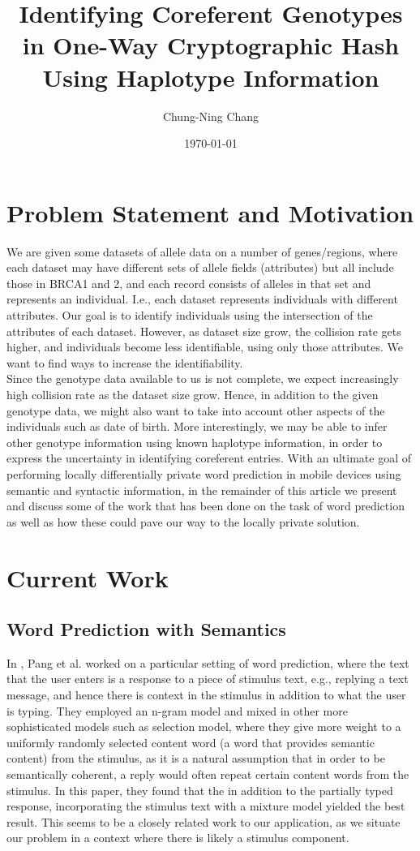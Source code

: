 \documentclass[14pt, oneside]{article}   	%
\title{Identifying Coreferent Genotypes in One-Way Cryptographic Hash Using Haplotype Information}
\author{Chung-Ning Chang}
\date{\today}							%
\begin{document}
\maketitle
\section{Problem Statement and Motivation}
We are given some datasets of allele data on a number of genes/regions, where each dataset may have different sets of allele fields (attributes) but all include those in BRCA1 and 2, and each record consists of alleles in that set and represents an individual. I.e., each dataset represents individuals with different attributes. Our goal is to identify individuals using the intersection of the attributes of each dataset. However, as dataset size grow, the collision rate gets higher, and individuals become less identifiable, using only those attributes. We want to find ways to increase the identifiability.
\\

Since the genotype data available to us is not complete, we expect increasingly high collision rate as the dataset size grow.
Hence, in addition to the given genotype data, we might also want to take into account other aspects of the individuals such as date of birth.
More interestingly, we may be able to infer other genotype information using known haplotype information,
in order to express the uncertainty in identifying coreferent entries.
With an ultimate goal of performing locally differentially private word prediction
in mobile devices using semantic and syntactic information,
in the remainder of this article we present and discuss some of the work
that has been done on the task of word prediction
as well as how these could pave our way to the locally private solution.\\
%
%
%
%
%
%
%
%
%
\section{Current Work}
\subsection{Word Prediction with Semantics}
In \cite{pang2012revisiting},
Pang et al. worked on a particular setting of word prediction,
where the text that the user enters is a response to a piece of stimulus text, e.g., replying a text message,
and hence there is context in the stimulus in addition to what the user is typing.
They employed an n-gram model and mixed in other more sophisticated models such as
selection model, where they give more weight to a uniformly randomly selected content word
(a word that provides semantic content)
from the stimulus, as it is a natural assumption that in order to be semantically coherent,
a reply would often repeat certain content words from the stimulus.
In this paper, they found that the in addition to the partially typed response,
incorporating the stimulus text with a mixture model yielded the best result.
This seems to be a closely related work to our application,
as we situate our problem in a context where there is likely a stimulus component.\\
\end{document}
